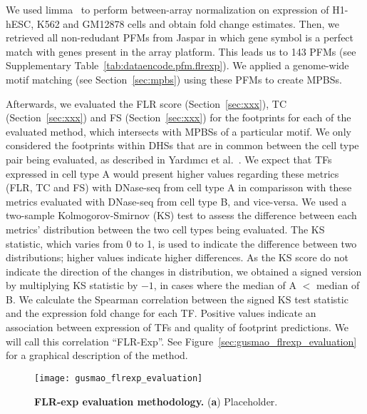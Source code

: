We used limma~\cite{ritchie2015} to perform between-array normalization on expression of H1-hESC, K562 and GM12878 cells and obtain fold change estimates. Then, we retrieved all non-redudant PFMs from Jaspar in which gene symbol is a perfect match with genes present in the array platform. This leads us to 143 PFMs (see Supplementary Table~\ref{tab:dataencode.pfm.flrexp}). We applied a genome-wide motif matching (see Section~\ref{sec:mpbs}) using these PFMs to create MPBSs.

Afterwards, we evaluated the FLR score (Section~\ref{sec:xxx}), TC (Section~\ref{sec:xxx}) and FS (Section~\ref{sec:xxx}) for the footprints for each of the evaluated method, which intersects with MPBSs of a particular motif. We only considered the footprints within DHSs that are in common between the cell type pair being evaluated, as described in Yard{\i}mc{\i} et al.~\cite{yardimci2014}. We expect that TFs expressed in cell type A would present higher values regarding these metrics (FLR, TC and FS) with DNase-seq from cell type A in comparisson with these metrics evaluated with DNase-seq from cell type B, and vice-versa. We used a two-sample Kolmogorov-Smirnov (KS) test to assess the difference between each metrics' distribution between the two cell types being evaluated. The KS statistic, which varies from 0 to 1, is used to indicate the difference between two distributions; higher values indicate higher differences. As the KS score do not indicate the direction of the changes in distribution, we obtained a signed version by multiplying KS statistic by $-1$, in cases where the median of A $<$ median of B. We calculate the Spearman correlation between the signed KS test statistic and the expression fold change for each TF. Positive values indicate an association between expression of TFs and quality of footprint predictions. We will call this correlation ``FLR-Exp''. See Figure~\ref{sec:gusmao_flrexp_evaluation} for a graphical description of the method.

\begin{figure}[h!]
\centering
\texttt{[image: gusmao\_flrexp\_evaluation]}
\caption[FLR-exp evaluation methodology]{\textbf{FLR-exp evaluation methodology.} (\textbf{a}) Placeholder.}
\label{fig:gusmao_flrexp_evaluation}
\end{figure}


